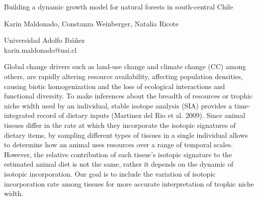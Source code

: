 \documentclass[a4paper]{article}
\begin{document}

\Large
\begin{center}
Building a dynamic growth model for natural forests in south-central Chile\\ 

\hspace{10pt}

\large
Karin Maldonado, Constanza Weinberger, Natalia Ricote\\

\hspace{10pt}

\small  
Universidad Adolfo Ibáñez\\
karin.maldonado@uai.cl\\

\end{center}

\hspace{10pt}

\normalsize

Global change drivers such as land-use change and climate change (CC) among others, are rapidly altering resource availability, affecting population densities, causing biotic homogenization and the loss of ecological interactions and functional diversity. To make inferences about the breadth of resources or trophic niche width used by an individual, stable isotope analysis (SIA) provides a time-integrated record of dietary inputs (Martinez del Rio et al. 2009). Since animal tissues differ in the rate at which they incorporate the isotopic signatures of dietary items, by sampling different types of tissues in a single individual allows to determine how an animal uses resources over a range of temporal scales. However, the relative contribution of each tissue's isotopic signature to the estimated animal diet is not the same, rather it depends on the dynamic of isotopic incorporation. Our goal is to include the variation of isotopic incorporation rate among tissues for more accurate interpretation of trophic niche width.
\end{document}

